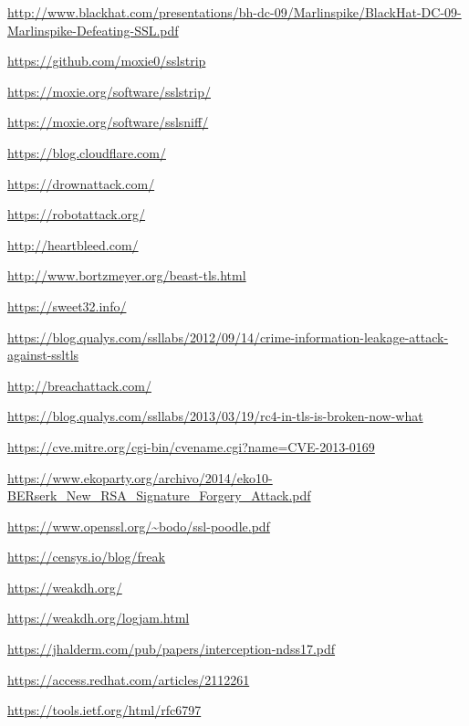 \begin{thebibliography}{4}

  \url{http://www.blackhat.com/presentations/bh-dc-09/Marlinspike/BlackHat-DC-09-Marlinspike-Defeating-SSL.pdf}

  \url{https://github.com/moxie0/sslstrip}

  \url{https://moxie.org/software/sslstrip/}

  \url{https://moxie.org/software/sslsniff/}

  \url{https://blog.cloudflare.com/}

  \url{https://drownattack.com/}

  \url{https://robotattack.org/}

  \url{http://heartbleed.com/}

  \url{http://www.bortzmeyer.org/beast-tls.html}

  \url{https://sweet32.info/}

  \url{https://blog.qualys.com/ssllabs/2012/09/14/crime-information-leakage-attack-against-ssltls}

  \url{http://breachattack.com/}

  \url{https://blog.qualys.com/ssllabs/2013/03/19/rc4-in-tls-is-broken-now-what}

  \url{https://cve.mitre.org/cgi-bin/cvename.cgi?name=CVE-2013-0169}

  \url{https://www.ekoparty.org/archivo/2014/eko10-BERserk_New_RSA_Signature_Forgery_Attack.pdf}

  \url{https://www.openssl.org/~bodo/ssl-poodle.pdf}

  \url{https://censys.io/blog/freak}

  \url{https://weakdh.org/}

  \url{https://weakdh.org/logjam.html}

  \url{https://jhalderm.com/pub/papers/interception-ndss17.pdf}

  \url{https://access.redhat.com/articles/2112261}

  \url{https://tools.ietf.org/html/rfc6797}

\end{thebibliography}
